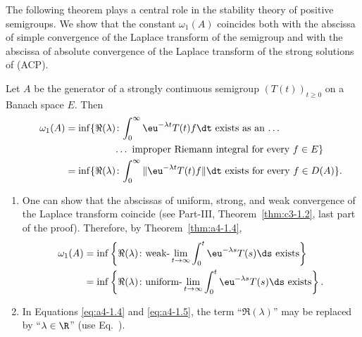 The following theorem plays a central role in the stability theory of positive semigroups.
We show that the constant $\omega_{1}(A)$ coincides both with the abscissa of simple convergence of the Laplace transform of the semigroup and with the abscissa of absolute convergence of the Laplace transform of the strong solutions of (ACP).
\begin{theorem}\label{thm:a4-1.4}
Let $A$ be the generator of a strongly continuous semigroup $ (T(t))_{t \geq 0} $ on a Banach space $E$. 
Then
\begin{equation}\label{eq:a4-1.4}
\begin{split}
\omega_{1}(A) = \inf\{\Re(\lambda) &\colon {\int_{0}^{\infty} \eu^{-\lambda t} T(t)f  \dt} \text{\ exists as an\  \ldots }\\
	\phantom{\inf\{\Re(\lambda) \colon exists as an} &\text{\ldots\  improper Riemann integral for every } f \in E\} \\
= \inf\{\Re(\lambda) &\colon {\int_{0}^{\infty} \|\eu^{-\lambda t} T(t)f\|  \dt} \text{ exists for every } f \in D(A)\}.  
\end{split}
\end{equation}
\end{theorem}
\begin{remarks*}\label{rem:a4-1.4}%
\begin{enumerate}[\upshape (i), wide, labelindent=.25em]

\item 
One can show that the abscissas of uniform, strong, and weak convergence of the Laplace transform coincide (see Part-III, Theorem~\ref{thm:c3-1.2}, last part of the proof). 
Therefore, by Theorem~\ref{thm:a4-1.4},
\begin{equation}\label{eq:a4-1.5}
\begin{split}
\omega_1(A) &= \inf \left\{ \Re(\lambda)\colon\text{weak-} \lim_{t \to \infty} {\int_0^t \eu^{-\lambda s} T(s)  \ds} \text{ exists} \right\} \\
    &= \inf \left\{ \Re(\lambda)\colon\text{uniform-} \lim_{t \to \infty} {\int_0^t \eu^{-\lambda s} T(s)  \ds} \text{ exists} \right\} .
\end{split}
\end{equation}
\item
In Equations \eqref{eq:a4-1.4} and \eqref{eq:a4-1.5}, the term \enquote{$\Re(\lambda)$} may be replaced by \enquote{$\lambda \in \R$} (use Eq.~).
\end{enumerate}
\end{remarks*}

